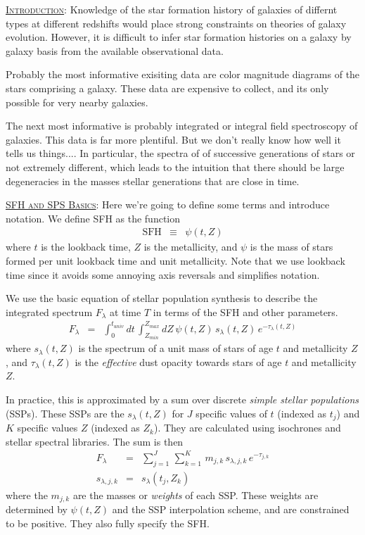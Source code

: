 \documentclass{article}
\begin{document}
\vspace{0.15in}

\underline{\textsc{Introduction}}: 
Knowledge of the star formation history of galaxies of differnt types at different redshifts would place strong constraints on theories of galaxy evolution.
However, it is difficult to infer star formation histories on a galaxy by galaxy basis from the available observational data.

Probably the most informative exisiting data are color magnitude diagrams of the stars comprising a galaxy.
These data are expensive to collect, and its only possible for very nearby galaxies.

The next most informative is probably integrated or integral field spectroscopy of galaxies.
This data is far more plentiful.
But we don't really know how well it tells us things....
In particular, the spectra of of successive generations of stars or not extremely different, 
which leads to the intuition that there should be large degeneracies in the masses stellar generations that are close in time.

\vspace{0.15in}

\underline{\textsc{SFH and SPS Basics}}:
Here we're going to define some terms and introduce notation. We define SFH as the function 
\begin{eqnarray}
\mathrm{SFH} & \equiv & \psi(t, Z)
\end{eqnarray}
where $t$ is the lookback time,
$Z$ is the metallicity,
and $\psi$ is the mass of stars formed per unit lookback time and unit metallicity.
Note that we use lookback time since it avoids some annoying axis reversals and simplifies notation.

We use the basic equation of stellar population synthesis to describe the integrated spectrum $F_\lambda$ at time $T$ in terms of the SFH and other parameters.
\begin{eqnarray}
F_\lambda & = & \int_0^{t_{univ}} dt \, \int_{Z_{min}}^{Z_{max}} dZ \, \psi(t, Z) \, s_\lambda(t, Z) \, e^{-\tau_\lambda(t, Z)}
\end{eqnarray}
where $s_\lambda(t, Z)$ is the spectrum of a unit mass of stars of age $t$ and metallicity $Z$, and
$\tau_\lambda(t, Z)$ is the \emph{effective} dust opacity towards stars of age $t$ and metallicity $Z$.

In practice, this is approximated by a sum over discrete \emph{simple stellar populations} (SSPs).  
These SSPs are the $s_\lambda(t, Z)$ for $J$ specific values of $t$ (indexed as $t_j$) and $K$ specific values $Z$ (indexed as $Z_k$).
They are calculated using isochrones and stellar spectral libraries.
The sum is then
\begin{eqnarray}
F_\lambda & = & \sum_{j=1}^J \, \sum_{k=1}^{K} \, m_{j,k} \, s_{\lambda, j,k} \, e^{-\tau_{j,k}} \\
s_{\lambda, j,k} & = & s_\lambda(t_j, Z_k)
\end{eqnarray}
where the $m_{j,k}$ are the masses or \emph{weights} of each SSP.  
These weights are determined by $\psi(t, Z)$ and the SSP interpolation scheme,  and are constrained to be positive.
They also fully specify the SFH.
\end{document}
